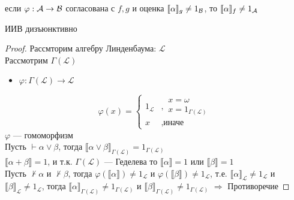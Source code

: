 \documentclass[english]{article}
\begin{document}
\begin{theorem}
	если \(\varphi: \mathcal{A} \to \mathcal{B}\) согласована с \(f, g\) и оценка \(\llbracket \alpha \rrbracket_g \neq 1_{\mathcal{B}}\), то \(\llbracket \alpha \rrbracket_f \neq 1_{\mathcal{A}}\)
	\label{org3be227f}
\end{theorem}
\begin{theorem}
	ИИВ дизъюнктивно
	\label{orgf52e300}
\end{theorem}
\begin{proof}
	Рассмторим алгебру Линденбаума: \(\mathcal{L}\) \\
	Рассмотрим \(\Gamma(\mathcal{L})\) \\
	\begin{itemize}
		\item \(\varphi: \Gamma(\mathcal{L}) \to \mathcal{L}\)
	\end{itemize}
	\[ \varphi(x) = \begin{cases}1_\mathcal{L} & ,\substack{x =\omega \\ x = 1_{\Gamma(\mathcal{L})}} \\ x & , \text{иначе}\end{cases} \]
	\(\varphi\) --- гомоморфизм \\
	Пусть \(\vdash \alpha \vee \beta\), тогда \(\llbracket \alpha \vee \beta \rrbracket_{\Gamma(\mathcal{L})} = 1_{\Gamma(\mathcal{L})}\) \\
	\(\llbracket \alpha + \beta \rrbracket = 1\), и т.к. \(\Gamma(\mathcal{L})\) --- Геделева то \(\llbracket \alpha \rrbracket = 1\) или \(\llbracket \beta \rrbracket = 1\) \\
	Пусть \(\not \vdash \alpha\) и \(\not \vdash \beta\), тогда \(\varphi(\llbracket \alpha \rrbracket) \neq 1_\mathcal{L}\) и \(\varphi(\llbracket \beta \rrbracket) \neq 1_\mathcal{L}\), т.е. \(\llbracket \alpha \rrbracket_\mathcal{L} \neq 1_\mathcal{L}\) и \(\llbracket \beta \rrbracket_\mathcal{L} \neq 1_\mathcal{L}\), тогда \(\llbracket \alpha \rrbracket_{\Gamma(\mathcal{L})} \neq 1_{\Gamma(\mathcal{L})}\) и \(\llbracket \beta \rrbracket_{\Gamma(\mathcal{L})} \neq 1_{\Gamma(\mathcal{L})}\) \(\Rightarrow\) Противоречие
\end{proof}
\end{document}
